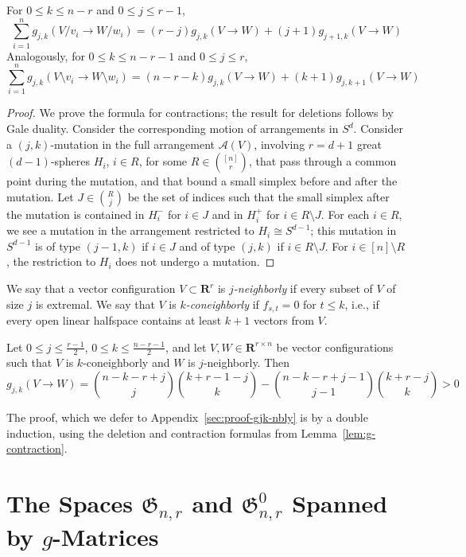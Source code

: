 \documentclass[a4paper,USenglish,cleveref, autoref, thm-restate,nolineno]{socg-lipics-v2021}
\newcommand{\arr}{\mathcal{A}}
\newcommand{\gspace}{\mathfrak{G}}
\renewcommand{\leq}{\leqslant}
\newcommand{\R}{\mathbf{R}}
\begin{document}
\begin{lemma}
\label{lem:g-contraction}
For $0\leq k\leq n-r$ and $0\leq j \leq r-1$,
\[
\sum_{i=1}^n g_{j,k}(V/v_i \to W/w_i)=(r-j)g_{j,k}(V\to W) + (j+1)g_{j+1,k}(V\to W)
\]
Analogously, for $0\leq k\leq n-r-1$ and $0\leq j\leq r$,
\[
\sum_{i=1}^n g_{j,k}(V \setminus  v_i \to W \setminus w_i)=(n-r-k)g_{j,k}(V\to W) + (k+1)g_{j,k+1}(V\to W)
\]
\end{lemma}
\begin{proof} We prove the formula for contractions; the result for deletions follows by Gale duality.
Consider the corresponding motion of arrangements in $S^d$. Consider a $(j,k)$-mutation in the full arrangement $\arr(V)$, involving $r=d+1$ great $(d-1)$-spheres $H_i$, $i\in R$, for some $R\in \binom{[n]}{r}$, that pass through a common point during the mutation, and that bound a small simplex before and after the mutation. Let $J\in \binom{R}{j}$ be the set of indices such that the small simplex after the mutation is contained in $H_i^-$ for $i\in J$ and in $H_i^+$ for $i\in R\setminus J$. For each $i\in R$, we see a mutation in the arrangement restricted to $H_i\cong S^{d-1}$; this mutation in $S^{d-1}$ is of type $(j-1,k)$ if $i\in J$ and of type $(j,k)$ if $i\in R\setminus J$. For $i\in [n]\setminus R$, the restriction to $H_i$ does not undergo a mutation.
\end{proof}

We say that a vector configuration $V\subset \R^r$ is \emph{$j$-neighborly} if every subset of $V$ of size $j$ is extremal. We say that $V$ is \emph{$k$-coneighborly} if $f_{s,t}=0$ for $t\leq k$, i.e., if every open linear halfspace contains at least $k+1$ vectors from $V$.
\begin{lemma}\label{gjk-nbly} Let $0\leq j\leq \frac{r-1}{2}$, $0\leq k\leq \frac{n-r-1}{2}$, and let $V,W \in \R^{r\times n}$ be vector configurations such that $V$ is $k$-coneighborly and $W$ is $j$-neighborly. Then 
\begin{equation}
\label{eq:gjk-nbly}
\textstyle g_{j,k}(V\to W)=\binom{n-k-r+j}{j}\binom{k+r-1-j}{k} - \binom{n-k-r+j-1}{j-1} \binom{k+r-j}{k} > 0
\end{equation}
\end{lemma}
The proof, which we defer to Appendix~\ref{sec:proof-gjk-nbly} is by a double induction, using the deletion and contraction formulas from Lemma~\ref{lem:g-contraction}. 


\section{The Spaces $\gspace_{n,r}$ and $\gspace_{n,r}^0$ Spanned by $g$-Matrices}
\label{sec:g-space}
\end{document}

